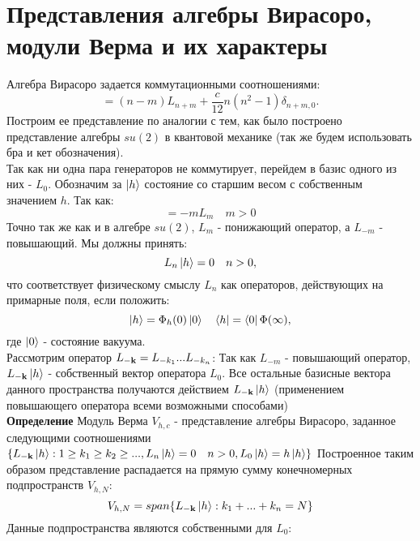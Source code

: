 \documentclass[12pt]{article}
\theoremstyle{definition}
\begin{document}
	\section{Представления алгебры Вирасоро, модули Верма и их характеры}
    Алгебра Вирасоро задается коммутационными соотношениями:
    	 \begin{equation}
 	    [L_n,L_m]=(n-m)L_{n+m}+\frac{c}{12}n(n^2-1)\delta_{n+m,0}.
 	\end{equation}	
  Построим ее представление по аналогии с тем, как было построено представление алгебры $su(2)$ в квантовой механике (так же будем использовать бра и кет обозначения). \\
  Так как ни одна пара генераторов не коммутирует, перейдем в базис одного из них - $L_0$.  Обозначим за $\ket{h}$ состояние со старшим весом с собственным значением $h$. Так как:
  	\begin{equation}
 	    [L_0,L_m]=-mL_{m} \quad m >0 
 	\end{equation}	
Точно так же как и в алгебре $su(2)$, $L_m$ - понижающий оператор, а  $L_{-m}$ - повышающий. Мы должны принять:
 	\begin{equation}
 	    L_n\ket{h}=0 \quad n >0, 
 	\end{equation}
  что соответствует физическому смыслу $L_{n}$ как операторов, действующих на примарные поля, если положить: 
  \begin{equation}
 	    \ket{h} = \Phi_{h}(0) \ket{0}\quad
            \bra{h} =\bra{0} \Phi(\infty), 
 	\end{equation}
        где  $\ket{0}$ - состояние вакуума.\\
        Рассмотрим оператор $ L_{\bold{-k}} = L_{-k_1}...L_{-k_n}$:
         Так как $L_{-m}$ - повышающий оператор, $ L_{\bold{-k}}\ket{h}$ - собственный вектор оператора $L_0$. Все остальные базисные вектора данного пространства получаются действием $L_{\bold{-k}}\ket{h}$ (применением повышающего оператора всеми возможными способами)\\
         \textbf{Определение} Модуль Верма $V_{h,c}$ - представление алгебры Вирасоро, заданное следующими соотношениями $\{  L_{\bold{-k}}\ket{h}: 1\geq k_1\geq k_2\geq...,  L_n\ket{h}=0 \quad n >0,  L_0\ket{h}=h\ket{h} \}$
         Построенное таким образом представление распадается на прямую сумму конечномерных подпространств $V_{h, N}$:
           \begin{equation}
 	    V_{h, N} = span\{L_{\bold{-k}}\ket{h}:k_1+...+k_n=N\}
 	\end{equation}
  Данные подпространства являются собственными для $L_0$:
\end{document}
